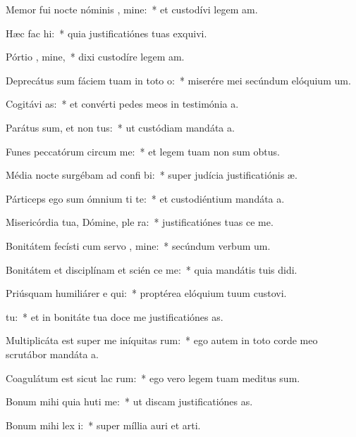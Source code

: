 \item Memor fui nocte nóminis , mine:~* et custodívi legem am.
\item Hæc fac  hi:~* quia justificatiónes tuas exquivi.
\item Pórtio , mine,~* dixi custodíre legem am.
\item Deprecátus sum fáciem tuam in toto  o:~* miserére mei secúndum elóquium um.
\item Cogitávi  as:~* et convérti pedes meos in testimónia a.
\item Parátus sum, et non  tus:~* ut custódiam mandáta a.
\item Funes peccatórum circum  me:~* et legem tuam non sum obtus.
\item Média nocte surgébam ad confi bi:~* super judícia justificatiónis æ.
\item Párticeps ego sum ómnium ti te:~* et custodiéntium mandáta a.
\item Misericórdia tua, Dómine, ple  ra:~* justificatiónes tuas ce me.
\item Bonitátem fecísti cum servo , mine:~* secúndum verbum um.
\item Bonitátem et disciplínam et scién ce me:~* quia mandátis tuis didi.
\item Priúsquam humiliárer e qui:~* proptérea elóquium tuum custovi.
\item {}  tu:~* et in bonitáte tua doce me justificatiónes as.
\item Multiplicáta est super me iníquitas rum:~* ego autem in toto corde meo scrutábor mandáta a.
\item Coagulátum est sicut lac  rum:~* ego vero legem tuam meditus sum.
\item Bonum mihi quia huti me:~* ut discam justificatiónes as.
\item Bonum mihi lex  i:~* super míllia auri et arti.
